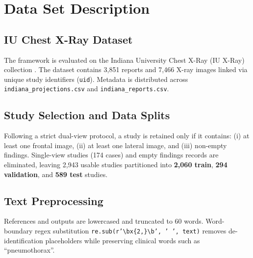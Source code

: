 \documentclass[12pt,a4paper]{report}
\begin{document}
\chapter{Data Set Description}

\section{IU Chest X-Ray Dataset}
The framework is evaluated on the Indiana University Chest X-Ray (IU X-Ray) collection \cite{demner2016preparing}. The dataset contains 3,851 reports and 7,466 X-ray images linked via unique study identifiers (\texttt{uid}). Metadata is distributed across \texttt{indiana\_projections.csv} and \texttt{indiana\_reports.csv}.

\section{Study Selection and Data Splits}
Following a strict dual-view protocol, a study is retained only if it contains: (i) at least one frontal image, (ii) at least one lateral image, and (iii) non-empty findings. Single-view studies (174 cases) and empty findings records are eliminated, leaving 2,943 usable studies partitioned into \textbf{2,060 train}, \textbf{294 validation}, and \textbf{589 test} studies.

\section{Text Preprocessing}
References and outputs are lowercased and truncated to 60 words. Word-boundary regex substitution \texttt{re.sub(r'\textbackslash bx\{2,\}\textbackslash b', ' ', text)} removes de-identification placeholders while preserving clinical words such as ``pneumothorax''.
\end{document}
